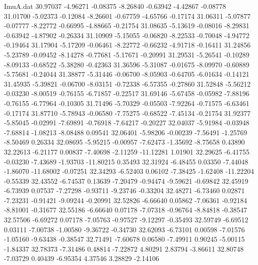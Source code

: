 \begin{filecontents}{ImuA.dat}
  30.97037   -4.96271   -0.08375   -8.26840   -0.63942   -4.42867   -0.08778
  31.01700   -5.02373   -0.12084   -8.26601   -0.67759   -4.65766   -0.17174
  31.06311   -5.07877   -0.07777   -8.22772   -0.66995   -4.88665   -0.21754
  31.08635   -5.13619   -0.08016   -8.29831   -0.63942   -4.87902   -0.26334
  31.10909   -5.15055   -0.06820   -8.22533   -0.70048   -4.94772   -0.19464
  31.17904   -5.17209   -0.06461   -8.22772   -0.66232   -4.91718   -0.16411
  31.24856   -5.23789   -0.09452   -8.14278   -0.77681   -5.17671   -0.20991
  31.29531   -5.26541   -0.10289   -8.09133   -0.68522   -5.38280   -0.42363
  31.36596   -5.31087   -0.01675   -8.09970   -0.60889   -5.75681   -0.24044
  31.38877   -5.31446   -0.06700   -8.05903   -0.64705   -6.01634   -0.14121
  31.45935   -5.39821   -0.06700   -8.03151   -0.72338   -6.57355   -0.27860
  31.52848   -5.56212   -0.03230   -8.00519   -0.76155   -6.71857   -0.22517
  31.69146   -5.67458   -0.05982   -7.88196   -0.76155   -6.77964   -0.10305
  31.71496   -5.70329   -0.05503   -7.92264   -0.71575   -6.63461   -0.17174
  31.87710   -5.78943   -0.06580   -7.75275   -0.68522   -7.45134   -0.21754
  31.92377   -5.85045   -0.02991   -7.69891   -0.76918   -7.64217   -0.20227
  32.04037   -5.91984   -0.03948   -7.68814   -1.08213   -8.08488    0.09541
  32.06401   -5.98206   -0.00239   -7.56491   -1.25769   -8.50469    0.26334
  32.08695   -5.95215   -0.00957   -7.62473   -1.35692   -8.75658    0.43890
  32.22613   -6.21177    0.00837   -7.40698   -2.11259  -11.12281    1.01901
  32.29625   -6.41755   -0.03230   -7.43689   -1.93703  -11.80215    0.35493
  32.31924   -6.48455    0.03350   -7.44048   -1.86070  -11.68002   -0.07251
  32.34293   -6.52403    0.06102   -7.38425   -1.62408  -11.22204   -0.55339
  32.43552   -6.74537    0.13639   -7.20479   -0.94474   -9.59621   -0.69842
  32.45919   -6.73939    0.07537   -7.27298   -0.93711   -9.23746   -0.33204
  32.48271   -6.73460    0.02871   -7.23231   -0.91421   -9.09244   -0.20991
  32.52826   -6.66640    0.05862   -7.06361   -0.92184   -8.81001   -0.31677
  32.55186   -6.66640    0.07178   -7.07318   -0.96764   -8.84818   -0.38547
  32.57506   -6.69272    0.07178   -7.05763   -0.97527   -9.12297   -0.35493
  32.59749   -6.69512    0.03111   -7.00738   -1.00580   -9.36722   -0.34730
  32.62093   -6.73101    0.00598   -7.01576   -1.05160   -9.63438   -0.38547
  32.71491   -7.60678    0.06580   -7.49911    0.90245   -5.00115   -1.84337
  32.78373   -7.31486    0.48814   -7.22872    4.80291    2.83794   -3.86611
  32.80748   -7.03729    0.40439   -6.95354    4.37546    3.28829   -2.14106

\end{filecontents}
